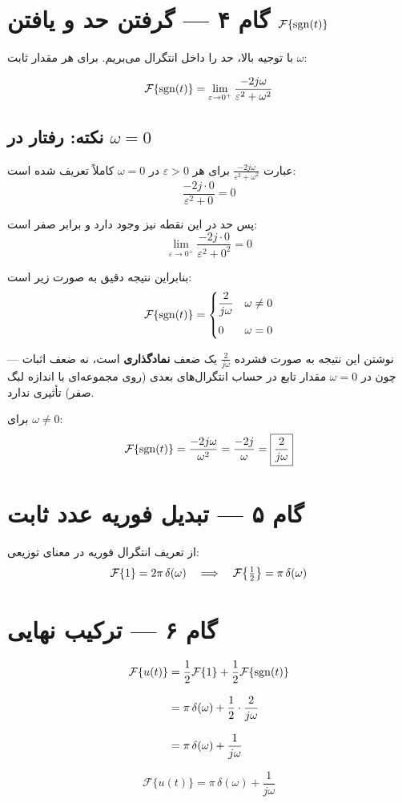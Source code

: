 \section*{گام ۴ --- گرفتن حد و یافتن \textenglish{$\mathcal{F}\{\operatorname{sgn}(t)\}$}}
 
با توجیه بالا، حد را داخل انتگرال می‌بریم. برای هر مقدار ثابت $\omega$:
 
\[
  \mathcal{F}\!\left\{\operatorname{sgn}(t)\right\}
  = \lim_{\varepsilon \to 0^+} \frac{-2j\omega}{\varepsilon^2 + \omega^2}
\]
 
\subsection*{نکته: رفتار در $\omega = 0$}
 
عبارت $\frac{-2j\omega}{\varepsilon^2 + \omega^2}$ برای هر $\varepsilon > 0$ در
$\omega = 0$ کاملاً تعریف شده است:
\[
  \frac{-2j \cdot 0}{\varepsilon^2 + 0} = 0
\]
 
پس حد در این نقطه نیز وجود دارد و برابر صفر است:
\[
  \lim_{\varepsilon \to 0^+} \frac{-2j \cdot 0}{\varepsilon^2 + 0^2} = 0
\]
 
بنابراین نتیجه دقیق به صورت زیر است:
\[
  \mathcal{F}\!\left\{\operatorname{sgn}(t)\right\} =
  \begin{cases}
    \dfrac{2}{j\omega} & \omega \neq 0 \\[10pt]
    0                  & \omega = 0
  \end{cases}
\]
 
نوشتن این نتیجه به صورت فشرده $\frac{2}{j\omega}$ یک ضعف \textbf{نمادگذاری} است،
نه ضعف اثبات --- چون در $\omega = 0$ مقدار تابع در حساب انتگرال‌های بعدی
(روی مجموعه‌ای با اندازه لبگ صفر) تأثیری ندارد.
 
برای $\omega \neq 0$:
\[
  \mathcal{F}\!\left\{\operatorname{sgn}(t)\right\}
  = \frac{-2j\omega}{\omega^2}
  = \frac{-2j}{\omega}
  = \boxed{\frac{2}{j\omega}}
\]
 
\section*{گام ۵ --- تبدیل فوریه عدد ثابت}
 
از تعریف انتگرال فوریه در معنای توزیعی:
\[
  \mathcal{F}\!\left\{1\right\} = 2\pi\,\delta(\omega)
  \quad\Longrightarrow\quad
  \mathcal{F}\!\left\{\tfrac{1}{2}\right\} = \pi\,\delta(\omega)
\]
 
\section*{گام ۶ --- ترکیب نهایی}
 
\begin{align*}
  \mathcal{F}\!\left\{u(t)\right\}
  &= \frac{1}{2}\mathcal{F}\!\left\{1\right\} + \frac{1}{2}\mathcal{F}\!\left\{\operatorname{sgn}(t)\right\} \\[8pt]
  &= \pi\,\delta(\omega) + \frac{1}{2} \cdot \frac{2}{j\omega} \\[8pt]
  &= \pi\,\delta(\omega) + \frac{1}{j\omega}
\end{align*}
 
\[
  \boxed{
    \mathcal{F}\bigl\{u(t)\bigr\}
    = \pi\,\delta(\omega) + \frac{1}{j\omega}
  }
\]
